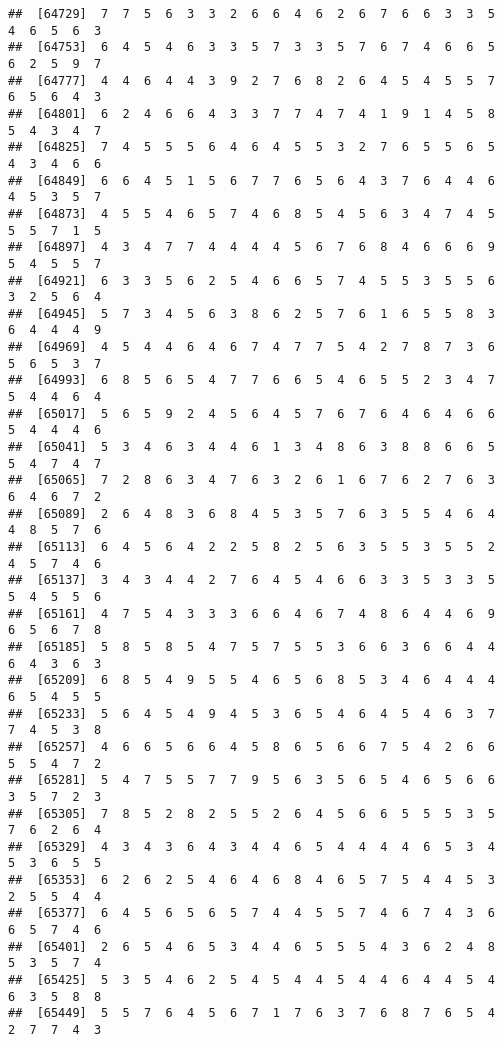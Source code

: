 \documentclass[
]{book}
\begin{document}
\begin{verbatim}
##  [64729]  7  7  5  6  3  3  2  6  6  4  6  2  6  7  6  6  3  3  5  4  6  5  6  3
##  [64753]  6  4  5  4  6  3  3  5  7  3  3  5  7  6  7  4  6  6  5  6  2  5  9  7
##  [64777]  4  4  6  4  4  3  9  2  7  6  8  2  6  4  5  4  5  5  7  6  5  6  4  3
##  [64801]  6  2  4  6  6  4  3  3  7  7  4  7  4  1  9  1  4  5  8  5  4  3  4  7
##  [64825]  7  4  5  5  5  6  4  6  4  5  5  3  2  7  6  5  5  6  5  4  3  4  6  6
##  [64849]  6  6  4  5  1  5  6  7  7  6  5  6  4  3  7  6  4  4  6  4  5  3  5  7
##  [64873]  4  5  5  4  6  5  7  4  6  8  5  4  5  6  3  4  7  4  5  5  5  7  1  5
##  [64897]  4  3  4  7  7  4  4  4  4  5  6  7  6  8  4  6  6  6  9  5  4  5  5  7
##  [64921]  6  3  3  5  6  2  5  4  6  6  5  7  4  5  5  3  5  5  6  3  2  5  6  4
##  [64945]  5  7  3  4  5  6  3  8  6  2  5  7  6  1  6  5  5  8  3  6  4  4  4  9
##  [64969]  4  5  4  4  6  4  6  7  4  7  7  5  4  2  7  8  7  3  6  5  6  5  3  7
##  [64993]  6  8  5  6  5  4  7  7  6  6  5  4  6  5  5  2  3  4  7  5  4  4  6  4
##  [65017]  5  6  5  9  2  4  5  6  4  5  7  6  7  6  4  6  4  6  6  5  4  4  4  6
##  [65041]  5  3  4  6  3  4  4  6  1  3  4  8  6  3  8  8  6  6  5  5  4  7  4  7
##  [65065]  7  2  8  6  3  4  7  6  3  2  6  1  6  7  6  2  7  6  3  6  4  6  7  2
##  [65089]  2  6  4  8  3  6  8  4  5  3  5  7  6  3  5  5  4  6  4  4  8  5  7  6
##  [65113]  6  4  5  6  4  2  2  5  8  2  5  6  3  5  5  3  5  5  2  4  5  7  4  6
##  [65137]  3  4  3  4  4  2  7  6  4  5  4  6  6  3  3  5  3  3  5  5  4  5  5  6
##  [65161]  4  7  5  4  3  3  3  6  6  4  6  7  4  8  6  4  4  6  9  6  5  6  7  8
##  [65185]  5  8  5  8  5  4  7  5  7  5  5  3  6  6  3  6  6  4  4  6  4  3  6  3
##  [65209]  6  8  5  4  9  5  5  4  6  5  6  8  5  3  4  6  4  4  4  6  5  4  5  5
##  [65233]  5  6  4  5  4  9  4  5  3  6  5  4  6  4  5  4  6  3  7  7  4  5  3  8
##  [65257]  4  6  6  5  6  6  4  5  8  6  5  6  6  7  5  4  2  6  6  5  5  4  7  2
##  [65281]  5  4  7  5  5  7  7  9  5  6  3  5  6  5  4  6  5  6  6  3  5  7  2  3
##  [65305]  7  8  5  2  8  2  5  5  2  6  4  5  6  6  5  5  5  3  5  7  6  2  6  4
##  [65329]  4  3  4  3  6  4  3  4  4  6  5  4  4  4  4  6  5  3  4  5  3  6  5  5
##  [65353]  6  2  6  2  5  4  6  4  6  8  4  6  5  7  5  4  4  5  3  2  5  5  4  4
##  [65377]  6  4  5  6  5  6  5  7  4  4  5  5  7  4  6  7  4  3  6  6  5  7  4  6
##  [65401]  2  6  5  4  6  5  3  4  4  6  5  5  5  4  3  6  2  4  8  5  3  5  7  4
##  [65425]  5  3  5  4  6  2  5  4  5  4  4  5  4  4  6  4  4  5  4  6  3  5  8  8
##  [65449]  5  5  7  6  4  5  6  7  1  7  6  3  7  6  8  7  6  5  4  2  7  7  4  3

\end{verbatim}
\end{document}
